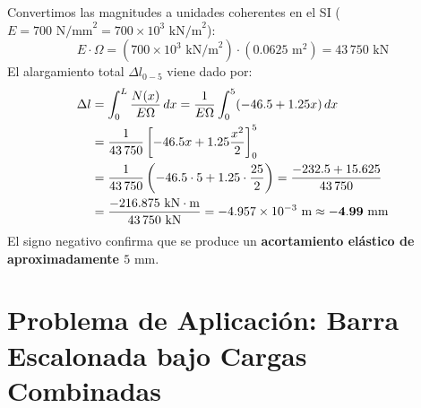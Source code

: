 {    
    
    Convertimos las magnitudes a unidades coherentes en el SI ($E = 700\text{ N/mm}^2 = 700 \times 10^3\text{ kN/m}^2$):
    \begin{equation}
        E \cdot \Omega = (700 \times 10^3\text{ kN/m}^2) \cdot (0.0625\text{ m}^2) = 43\,750\text{ kN}
    \end{equation}
    El alargamiento total $\Delta l_{0-5}$ viene dado por:
    \begin{align}
        \Delta l & = \int_0^L \frac{N(x)}{E\Omega} \, dx = \frac{1}{E\Omega} \int_0^5 (-46.5 + 1.25x) \, dx \notag \\
                 & = \frac{1}{43\,750} \left[ -46.5x + 1.25 \frac{x^2}{2} \right]_0^5 \notag \\
                 & = \frac{1}{43\,750} \left( -46.5 \cdot 5 + 1.25 \cdot \frac{25}{2} \right) = \frac{-232.5 + 15.625}{43\,750} \notag \\
                 & = \frac{-216.875\text{ kN}\cdot\text{m}}{43\,750\text{ kN}} = -4.957 \times 10^{-3}\text{ m} \approx \mathbf{-4.99\text{ mm}}
    \end{align}
    El signo negativo confirma que se produce un \textbf{acortamiento elástico de aproximadamente $5\text{ mm}$}.
}

\section{Problema de Aplicación: Barra Escalonada bajo Cargas Combinadas}

